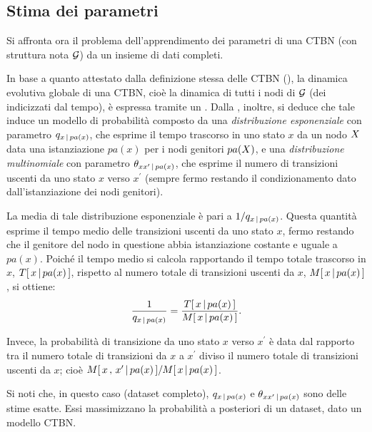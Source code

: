 \subsection{Stima dei parametri}
\label{sec:ctbn-params}
Si affronta ora il problema dell'apprendimento dei parametri di una \acl{CTBN} (con struttura nota $\mathcal{G}$) da un insieme di dati completi.

In base a quanto attestato dalla definizione stessa delle \acs{CTBN} (), la dinamica evolutiva globale di una \acs{CTBN}, cioè la dinamica di tutti i nodi di $\mathcal{G}$ (dei \mprocess{} \cond{} indicizzati dal tempo), è espressa tramite un \mprocess*{} \omog*{}. Dalla , inoltre, si deduce che tale \mprocess*{} induce un modello di probabilità composto da una \emph{distribuzione esponenziale} con parametro $q_{x\,\arrowvert\,pa(x)}$, che esprime il tempo trascorso in uno stato $x$ da un nodo $\mathnormal{X}$ data una istanziazione $pa(x)$ per i nodi genitori $pa(\mathnormal{X})$, e una \emph{distribuzione multinomiale} con parametro $\theta_{xx^\prime\,\arrowvert\,pa(x)}$, che esprime il numero di transizioni uscenti da uno stato $x$ verso $x^\prime$ (sempre fermo restando il condizionamento dato dall'istanziazione dei nodi genitori).

La media di tale distribuzione esponenziale è pari a $1/q_{x\,\arrowvert\,pa(x)}$. Questa quantità esprime il tempo medio delle transizioni uscenti da uno stato $x$, fermo restando che il genitore del nodo in questione abbia istanziazione costante e uguale a $pa(x)$. Poiché il tempo medio si calcola rapportando il tempo totale trascorso in $x$, $T[\,x\,\arrowvert\,pa(x)\,]$, rispetto al numero totale di transizioni uscenti da $x$, $\mstat{x\,\arrowvert\,pa(x)}$, si ottiene:
\[
\frac{1}{q_{x\,\arrowvert\,pa(x)}}=\frac{\tstat{x\,\arrowvert\,pa(x)}}{\mstat{x\,\arrowvert\,pa(x)}}\text{.}
\]

Invece, la probabilità di transizione da uno stato $x$ verso $x^\prime$ è data dal rapporto tra il numero totale di transizioni da $x$ a $x^\prime$ diviso il numero totale di transizioni uscenti da $x$; cioè $\mstat[x]{x^\prime\,\arrowvert\,pa(x)}/\mstat{x\,\arrowvert\,pa(x)}$.

Si noti che, in questo caso (dataset completo), $q_{x\,\arrowvert\,pa(x)}$ e $\theta_{xx^\prime\,\arrowvert\,pa(x)}$ sono delle stime esatte. Essi massimizzano la probabilità a posteriori di un dataset, dato un modello \acs{CTBN}.

